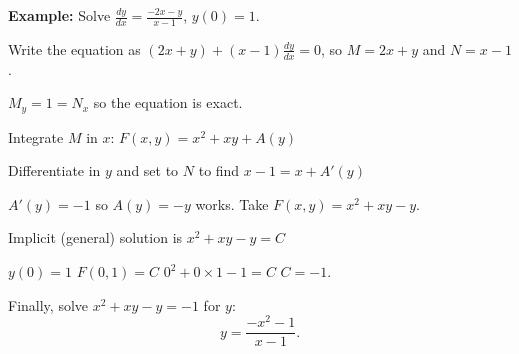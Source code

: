 \documentclass[10pt,aspectratio=169]{beamer}
\begin{document}
\begin{frame}

\textbf{Example:}
Solve
\quad $\displaystyle \frac{dy}{dx} = \frac{-2x-y}{x-1}$, \quad $y(0) = 1$.

\medskip
\pause

Write the equation as \quad
$\displaystyle
(2x+y) + (x-1)\frac{dy}{dx} = 0$,
\quad
\pause
so \quad $M = 2x+y$ \quad and \quad $N = x-1$.

\medskip
\pause

$M_y = 1 = N_x$
\quad
so the equation is exact.

\medskip
\pause

Integrate $M$ in $x$:
\quad
$F(x,y) = x^2+xy + A(y)$

\medskip
\pause

Differentiate in $y$ and set to $N$ to find
\quad
$x-1 = x + A'(y)$

\medskip
\pause

$A'(y) = -1$ \quad so \quad $A(y) = -y$ works.
\quad
\pause
Take \quad $F(x,y) = x^2+xy-y$.

\medskip
\pause

Implicit (general) solution is \quad
$x^2+xy-y = C$

\medskip
\pause

$y(0)=1$ \wthus $F(0,1) = C$ \pause \wthus $0^2+0\times 1 - 1 = C$ \pause
\wthus $C=-1$.

\medskip
\pause

Finally, solve $x^2+xy-y = -1$ for $y$:
\[
y = \frac{-x^2-1}{x-1} .
\]
\end{frame}
\end{document}
